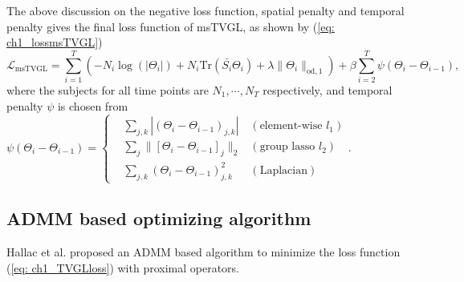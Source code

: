 The above discussion on the negative loss function, spatial penalty and temporal penalty gives the final loss function of msTVGL,
as shown by (\ref{eq: ch1_lossmsTVGL})
\begin{equation}
    \label{eq: ch1_lossmsTVGL}
    \mathcal{L}_{\text{msTVGL}} = \sum_{i=1}^{T}(-N_i\log(|\Theta_i|)+N_i\text{Tr}(\bar{S_i}\Theta_i) + \lambda\|\Theta_i\|_{\text{od},1}) +
    \beta\sum_{i=2}^{T}\psi(\Theta_i-\Theta_{i-1}),
\end{equation}
where the subjects for all time points are $N_1,\cdots,N_T$ respectively, 
and temporal penalty $\psi$ is chosen from $\psi(\Theta_i-\Theta_{i-1})=\left\{\begin{aligned}
        &\sum_{j,k}|(\Theta_i-\Theta_{i-1})_{j,k}| & (\text{element-wise } l_1) \\
        &\sum_{j}\|[\Theta_i-\Theta_{i-1}]_j\|_2 & (\text{group lasso } l_2) \\
        &\sum_{j,k}(\Theta_i-\Theta_{i-1})^2_{j,k} & (\text{Laplacian})
    \end{aligned}\right..$

\subsection{ADMM based optimizing algorithm}
Hallac et al.\cite{hallac2017networkinferencetimevaryinggraphical} proposed an ADMM based algorithm to minimize the loss function (\ref{eq: ch1_TVGLloss}) with proximal operators. 

